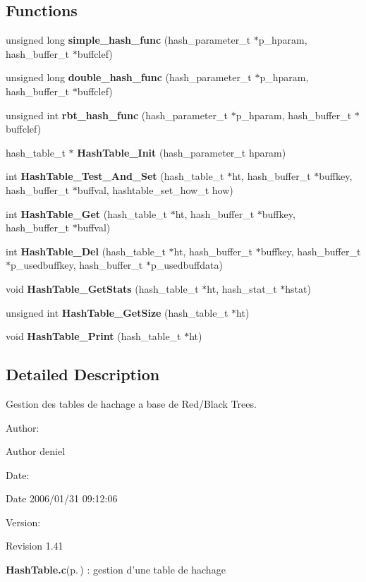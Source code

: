 \subsection*{Functions}
\begin{CompactItemize}
\item 
unsigned long {\bf simple\_\-hash\_\-func} (hash\_\-parameter\_\-t $\ast$p\_\-hparam, hash\_\-buffer\_\-t $\ast$buffclef)
\item 
unsigned long {\bf double\_\-hash\_\-func} (hash\_\-parameter\_\-t $\ast$p\_\-hparam, hash\_\-buffer\_\-t $\ast$buffclef)
\item 
unsigned int {\bf rbt\_\-hash\_\-func} (hash\_\-parameter\_\-t $\ast$p\_\-hparam, hash\_\-buffer\_\-t $\ast$buffclef)
\item 
hash\_\-table\_\-t $\ast$ {\bf Hash\-Table\_\-Init} (hash\_\-parameter\_\-t hparam)
\item 
int {\bf Hash\-Table\_\-Test\_\-And\_\-Set} (hash\_\-table\_\-t $\ast$ht, hash\_\-buffer\_\-t $\ast$buffkey, hash\_\-buffer\_\-t $\ast$buffval, hashtable\_\-set\_\-how\_\-t how)
\item 
int {\bf Hash\-Table\_\-Get} (hash\_\-table\_\-t $\ast$ht, hash\_\-buffer\_\-t $\ast$buffkey, hash\_\-buffer\_\-t $\ast$buffval)
\item 
int {\bf Hash\-Table\_\-Del} (hash\_\-table\_\-t $\ast$ht, hash\_\-buffer\_\-t $\ast$buffkey, hash\_\-buffer\_\-t $\ast$p\_\-usedbuffkey, hash\_\-buffer\_\-t $\ast$p\_\-usedbuffdata)
\item 
void {\bf Hash\-Table\_\-Get\-Stats} (hash\_\-table\_\-t $\ast$ht, hash\_\-stat\_\-t $\ast$hstat)
\item 
unsigned int {\bf Hash\-Table\_\-Get\-Size} (hash\_\-table\_\-t $\ast$ht)
\item 
void {\bf Hash\-Table\_\-Print} (hash\_\-table\_\-t $\ast$ht)
\end{CompactItemize}


\subsection{Detailed Description}
Gestion des tables de hachage a base de Red/Black Trees. 

\begin{Desc}
\item[Author:]\begin{Desc}
\item[Author]deniel \end{Desc}
\end{Desc}
\begin{Desc}
\item[Date:]\begin{Desc}
\item[Date]2006/01/31 09:12:06 \end{Desc}
\end{Desc}
\begin{Desc}
\item[Version:]\begin{Desc}
\item[Revision]1.41 \end{Desc}
\end{Desc}
{\bf Hash\-Table.c}{\rm (p.\,\pageref{HashTable_8c})} : gestion d'une table de hachage

